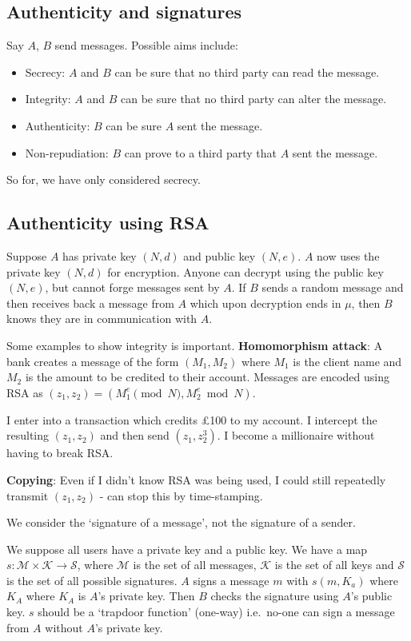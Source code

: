 \documentclass{article}
\newcommand{\1}[1]{\mathbbm{1}_{#1}}
\begin{document}
\subsection{Authenticity and signatures}
Say $A$, $B$ send messages. Possible aims include:
\begin{itemize}
    \item Secrecy: $A$ and $B$ can be sure that no third party can read the message.
    \item Integrity: $A$ and $B$ can be sure that no third party can alter the message.
    \item Authenticity: $B$ can be sure $A$ sent the message.
    \item Non-repudiation: $B$ can prove to a third party that $A$ sent the message.
\end{itemize}
So for, we have only considered secrecy.

\subsection{Authenticity using RSA}
Suppose $A$ has private key $(N, d)$ and public key $(N, e)$.
$A$ now uses the private key $(N, d)$ for encryption.
Anyone can decrypt using the public key $(N, e)$, but cannot forge messages sent by $A$.
If $B$ sends a random message and then receives back a message from $A$ which upon decryption ends in $\mu$, then $B$ knows they are in communication with $A$.

Some examples to show integrity is important.
\textbf{Homomorphism attack}: A bank creates a message of the form $(M_1, M_2)$ where $M_1$ is the client name and $M_2$ is the amount to be credited to their account.
Messages are encoded using RSA as $(z_1, z_2) = (M_1^e \pmod{N}, M_2^e \bmod{N})$.

I enter into a transaction which credits \pounds 100 to my account.
I intercept the resulting $(z_1, z_2)$ and then send $(z_1, z_2^3)$.
I become a millionaire without having to break RSA.

\textbf{Copying}: Even if I didn't know RSA was being used, I could still repeatedly transmit $(z_1, z_2)$ - can stop this by time-stamping.

\begin{remark}
    We consider the `signature of a message', not the signature of a sender.
\end{remark}

We suppose all users have a private key and a public key.
We have a map $s: \mathcal{M} \times \mathcal{K} \to \mathcal{S}$, where $\mathcal{M}$ is the set of all messages, $\mathcal{K}$ is the set of all keys and $\mathcal{S}$ is the set of all possible signatures.
$A$ signs a message $m$ with $s(m, K_a)$ where $K_A$ where $K_A$ is $A$'s private key.
Then $B$ checks the signature using $A$'s public key. $s$ should be a `trapdoor function' (one-way) i.e.\ no-one can sign a message from $A$ without $A$'s private key.
\end{document}
